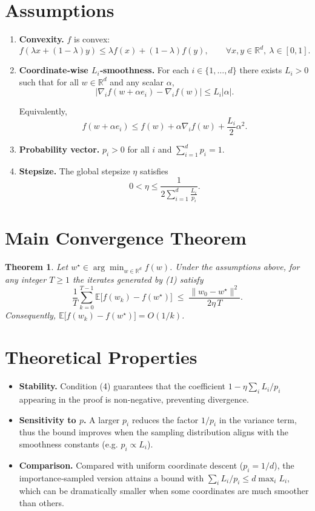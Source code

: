\documentclass{article}
\newtheorem{theorem}{Theorem}
\newcommand{\E}{\mathbb{E}}
\newcommand{\R}{\mathbb{R}}
\begin{document}
\newpage
\section*{Assumptions}
\begin{enumerate}
\item \textbf{Convexity.} $f$ is convex:
\[
f(\lambda x+(1-\lambda) y)\le \lambda f(x)+(1-\lambda)f(y),\qquad\forall x,y\in\R^{d},\ \lambda\in[0,1].
\]

\item \textbf{Coordinate‑wise $L_i$‑smoothness.} For each $i\in\{1,\dots ,d\}$ there exists $L_i>0$ such that for all $w\in\R^{d}$ and any scalar $\alpha$,
\[
\bigl|\nabla_i f(w+ \alpha e_i)-\nabla_i f(w)\bigr|\le L_i|\alpha|.
\tag{2}
\]

Equivalently,
\[
f(w+\alpha e_i)\le f(w)+\alpha \nabla_i f(w)+\frac{L_i}{2}\alpha^{2}.
\tag{3}
\]

\item \textbf{Probability vector.} $p_i>0$ for all $i$ and $\sum_{i=1}^{d}p_i=1$.

\item \textbf{Stepsize.} The global stepsize $\eta$ satisfies
\[
0<\eta\le \frac{1}{2\displaystyle\sum_{i=1}^{d}\frac{L_i}{p_i}}.
\tag{4}
\]
\end{enumerate}

\section*{Main Convergence Theorem}
\begin{theorem}
\label{thm:main}
Let $w^{\star}\in\arg\min_{w\in\R^{d}}f(w)$. Under the assumptions above,
for any integer $T\ge 1$ the iterates generated by (1) satisfy
\[
\frac{1}{T}\sum_{k=0}^{T-1}\E\!\bigl[f(w_k)-f(w^{\star})\bigr]
\;\le\;
\frac{\|w_0-w^{\star}\|^{2}}{2\eta\,T}.
\tag{5}
\]
Consequently, $ \E\!\bigl[f(w_k)-f(w^{\star})\bigr]=O(1/k) $.
\end{theorem}

\section*{Theoretical Properties}
\begin{itemize}
\item \textbf{Stability.} Condition (4) guarantees that the coefficient
$1-\eta\sum_{i}L_i/p_i$ appearing in the proof is non‑negative,
preventing divergence.
\item \textbf{Sensitivity to $p$.} A larger $p_i$ reduces the factor
$1/p_i$ in the variance term, thus the bound improves when the sampling
distribution aligns with the smoothness constants (e.g. $p_i\propto L_i$).
\item \textbf{Comparison.} Compared with uniform coordinate descent
($p_i=1/d$), the importance‑sampled version attains a bound with
$\sum_i L_i/p_i\le d\max_i L_i$, which can be dramatically smaller when
some coordinates are much smoother than others.
\end{itemize}
\end{document}
